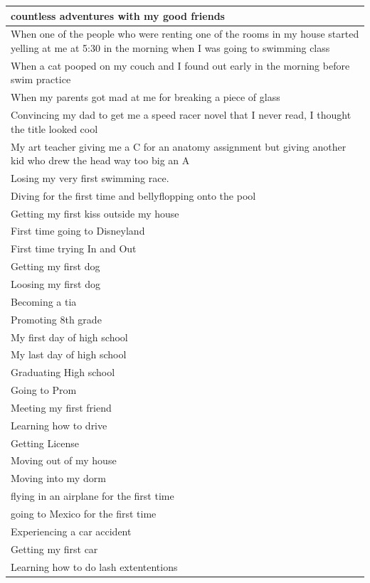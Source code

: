 \documentclass[
  .7em,
  letterpaper,
  DIV=11,
  numbers=noendperiod]{scrartcl}
\begin{document}
\begin{table}
\begin{tabular}{l}
\hline
countless adventures with my good friends\\
\hline
When one of the people who were renting one of the rooms in my house started yelling at me at 5:30 in the morning when I was going to swimming class\\
\hline
When a cat pooped on my couch and I found out early in the morning before swim practice\\
\hline
When my parents got mad at me for breaking a piece of glass\\
\hline
Convincing my dad to get me a speed racer novel that I never read, I thought the title looked cool\\
\hline
My art teacher giving me a C for an anatomy assignment but giving another kid who drew the head way too big an A\\
\hline
Losing my very first swimming race.\\
\hline
Diving for the first time and bellyflopping onto the pool\\
\hline
Getting my first kiss outside my house\\
\hline
First time going to Disneyland\\
\hline
First time trying In and Out\\
\hline
Getting my first dog\\
\hline
Loosing my first dog\\
\hline
Becoming a tia\\
\hline
Promoting 8th grade\\
\hline
My first day of high school\\
\hline
My last day of high school\\
\hline
Graduating High school\\
\hline
Going to Prom\\
\hline
Meeting my first friend\\
\hline
Learning how to drive\\
\hline
Getting License\\
\hline
Moving out of my house\\
\hline
Moving into my dorm\\
\hline
flying in an airplane for the first time\\
\hline
going to Mexico for the first time\\
\hline
Experiencing a car accident\\
\hline
Getting my first car\\
\hline
Learning how to do lash extententions\\

\end{tabular}
\end{table}
\end{document}
